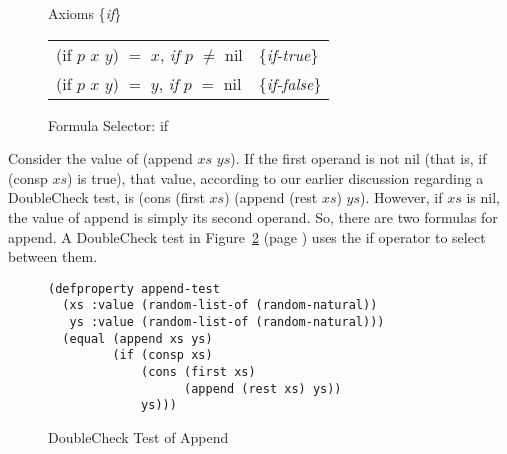 \begin{figure}
\begin{center}
Axioms \{\emph{if}\} \\
\begin{tabular}{ll}
\textsf{(if $p$ $x$ $y$}) $=$ $x$, \emph{if} $p$ $\neq$ \textsf{nil}  & \{\emph{if-true}\}  \\
\textsf{(if $p$ $x$ $y$)} $=$ $y$, \emph{if} $p$ $=$ \textsf{nil}     & \{\emph{if-false}\} \\
\end{tabular}
\end{center}
\caption{Formula Selector: \textsf{if}}
\label{fig:if-axioms}
\end{figure}

Consider the value of \textsf{(append $xs$ $ys$)}.
If the first operand is not \textsf{nil} (that is, if \textsf{(consp $xs$)} is true),
that value, according to our earlier discussion regarding a DoubleCheck test, is
\textsf{(cons (first $xs$) (append (rest $xs$) $ys$)}.
However, if $xs$ is nil, the value of \textsf{append}
is simply its second operand.
So, there are two formulas for append.
A DoubleCheck test in Figure~\ref{fig:append-test} (page \pageref{fig:append-test})
uses the \textsf{if} operator to select between them.

\begin{figure}
\begin{Verbatim}
(defproperty append-test
  (xs :value (random-list-of (random-natural))
   ys :value (random-list-of (random-natural)))
  (equal (append xs ys)
         (if (consp xs)
             (cons (first xs)
                   (append (rest xs) ys))
             ys)))
\end{Verbatim}
\caption{DoubleCheck Test of Append}
\label{fig:append-test}
\end{figure}

